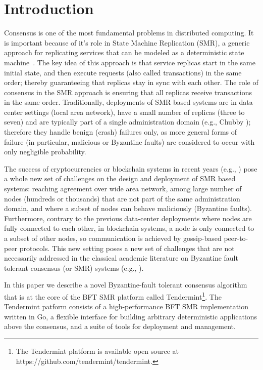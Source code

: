 \section{Introduction} \label{sec:tendermint}

Consensus is one of the most fundamental problems in distributed computing. It
is important because of it's role in State Machine Replication (SMR), a generic
approach for replicating services that can be modeled as a deterministic state
machine~\cite{Lam78:cacm, Sch90:survey}. The key idea of this approach is that
service replicas start in the same initial state, and then execute requests
(also called transactions) in the same order; thereby guaranteeing that
replicas stay in sync with each other. The role of consensus in the SMR
approach is ensuring that all replicas receive transactions in the same order.
Traditionally, deployments of SMR based systems are in data-center settings
(local area network), have a small number of replicas (three to seven) and are
typically part of a single administration domain (e.g., Chubby
\cite{Bur:osdi06}); therefore they handle benign (crash) failures only, as more
general forms of failure (in particular, malicious or Byzantine faults) are
considered to occur with only negligible probability.  

The success of cryptocurrencies or blockchain systems in recent years (e.g.,
\cite{Nak2012:bitcoin, But2014:ethereum}) pose a whole new set of challenges on
the design and deployment of SMR based systems: reaching agreement over wide
area network, among large number of nodes (hundreds or thousands) that are not
part of the same administration domain, and where a subset of nodes can behave
maliciously (Byzantine faults). Furthermore, contrary to the previous
data-center deployments where nodes are fully connected to each other, in
blockchain systems, a node is only connected to a subset of other nodes, so
communication is achieved by gossip-based peer-to-peer protocols. This new
setting poses a new set of challenges that are not necessarily addressed in the
classical academic literature on Byzantine fault tolerant consensus (or SMR)
systems (e.g., \cite{DLS88:jacm, CL02:tcs}).

In this paper we describe a novel Byzantine-fault tolerant consensus algorithm
that is at the core of the BFT SMR platform called Tendermint\footnote{The
Tendermint platform is available open source at
https://github.com/tendermint/tendermint.}. The Tendermint patform consists of
a high-performance BFT SMR implementation written in Go, a flexible interface for
building arbitrary deterministic applications above the consensus, and a suite
of tools for deployment and management.  

